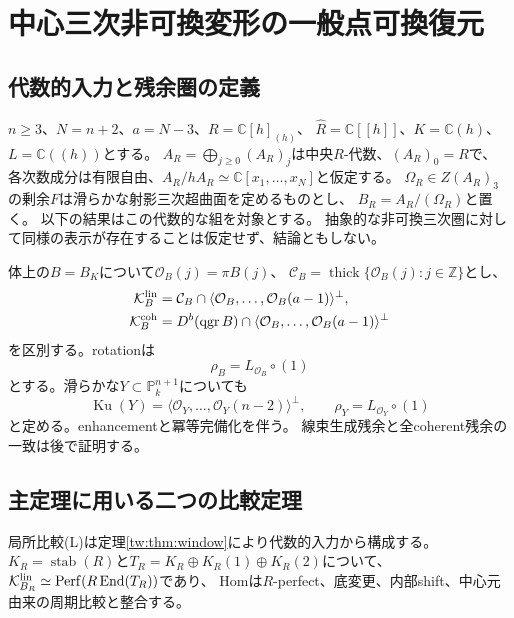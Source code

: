 \section{中心三次非可換変形の一般点可換復元}
\label{gdr:sec:main}

\subsection{代数的入力と残余圏の定義}
$n\ge3$、$N=n+2$、$a=N-3$、$R=\mathbb C[h]_{(h)}$、
$\widehat R=\mathbb C[[h]]$、$K=\mathbb C(h)$、$L=\mathbb C((h))$とする。
$A_R=\bigoplus_{j\ge0}(A_R)_j$は中央$R$-代数、$(A_R)_0=R$で、
各次数成分は有限自由、$A_R/hA_R\simeq\mathbb C[x_1,\ldots,x_N]$と仮定する。
$\Omega_R\in Z(A_R)_3$の剰余$F$は滑らかな射影三次超曲面を定めるものとし、
$B_R=A_R/(\Omega_R)$と置く。
以下の結果はこの代数的な組を対象とする。
抽象的な非可換三次圏に対して同様の表示が存在することは仮定せず、結論ともしない。

体上の$B=B_K$について$\mathcal O_B(j)=\pi B(j)$、
$\mathcal C_B=\operatorname{thick}\{\mathcal O_B(j):j\in\mathbb Z\}$とし、
\begin{equation}\label{gdr:eq:residual-defs}
\begin{aligned}
 \mathcal K_B^{\rm lin}
 &=\mathcal C_B\cap\langle\mathcal O_B,\ldots,\mathcal O_B(a-1)\rangle^\perp,\\
 \mathcal K_B^{\rm coh}
 &=D^b(\operatorname{qgr}B)\cap\langle\mathcal O_B,\ldots,\mathcal O_B(a-1)\rangle^\perp
\end{aligned}
\end{equation}
を区別する。rotationは
\begin{equation}\label{gdr:eq:rotation}
 \rho_B=L_{\mathcal O_B}\circ(1)
\end{equation}
とする。滑らかな$Y\subset\mathbb P^{n+1}_k$についても
\begin{equation}\label{gdr:eq:ku-def}
 \operatorname{Ku}(Y)=\langle\mathcal O_Y,\ldots,\mathcal O_Y(n-2)\rangle^\perp,
 \qquad \rho_Y=L_{\mathcal O_Y}\circ(1)
\end{equation}
と定める。enhancementと冪等完備化を伴う。
線束生成残余と全coherent残余の一致は後で証明する。

\subsection{主定理に用いる二つの比較定理}
局所比較(L)は定理\ref{tw:thm:window}により代数的入力から構成する。
$K_R=\operatorname{stab}(R)$と$T_R=K_R\oplus K_R(1)\oplus K_R(2)$について、
$\mathcal K^{\rm lin}_{B_R}\simeq\operatorname{Perf}(R\operatorname{End}(T_R))$であり、
Homは$R$-perfect、底変更、内部shift、中心元由来の周期比較と整合する。

